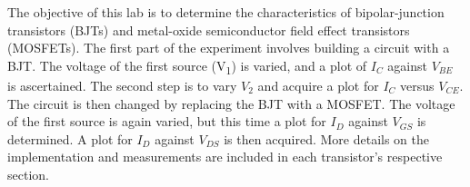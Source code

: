The objective of this lab is to determine the characteristics of bipolar-junction transistors (BJTs) and metal-oxide semiconductor field effect transistors (MOSFETs). The first part of the experiment involves building a circuit with a BJT. The voltage of the first source (V\textsubscript{1}) is varied, and a plot of $I_C$ against $V_{BE}$ is ascertained. The second step is to vary $V_2$ and acquire a plot for $I_C$ versus $V_{CE}$. The circuit is then changed by replacing the BJT with a MOSFET. The voltage of the first source is again varied, but this time a plot for $I_D$ against $V_{GS}$ is determined. A plot for $I_D$ against $V_{DS}$ is then acquired. More details on the implementation and measurements are included in each transistor's respective section. \\